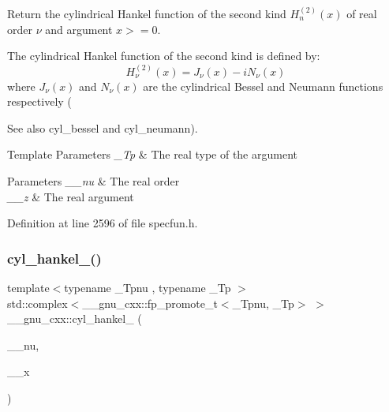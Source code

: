 Return the cylindrical Hankel function of the second kind $ H^{(2)}_n(x) $ of real order $ \nu $ and argument $ x >= 0 $.

The cylindrical Hankel function of the second kind is defined by\+: \[ H^{(2)}_\nu(x) = J_\nu(x) - iN_\nu(x) \] where $ J_\nu(x) $ and $ N_\nu(x) $ are the cylindrical Bessel and Neumann functions respectively (\begin{DoxySeeAlso}{See also}
cyl\+\_\+bessel and cyl\+\_\+neumann).
\end{DoxySeeAlso}

\begin{DoxyTemplParams}{Template Parameters}
{\em \+\_\+\+Tp} & The real type of the argument \\
\hline
\end{DoxyTemplParams}

\begin{DoxyParams}{Parameters}
{\em \+\_\+\+\_\+nu} & The real order \\
\hline
{\em \+\_\+\+\_\+z} & The real argument \\
\hline
\end{DoxyParams}


Definition at line 2596 of file specfun.\+h.

\mbox{\label{group__gnu__math__spec__func_ga326764c0d2dca072c411573503968e50}} 
\subsubsection{\texorpdfstring{cyl\+\_\+hankel\+\_()}{cyl\_hankel\_2()}\hspace{0.1cm}{\footnotesize\ttfamily [2/2]}}
{\footnotesize\ttfamily template$<$typename \+\_\+\+Tpnu , typename \+\_\+\+Tp $>$ \\
std\+::complex$<$\+\_\+\+\_\+gnu\+\_\+cxx\+::fp\+\_\+promote\+\_\+t$<$\+\_\+\+Tpnu, \+\_\+\+Tp$>$ $>$ \+\_\+\+\_\+gnu\+\_\+cxx\+::cyl\+\_\+hankel\+\_ (\begin{DoxyParamCaption}\item[{std\+::complex$<$ \+\_\+\+Tpnu $>$}]{\+\_\+\+\_\+nu,  }\item[{std\+::complex$<$ \+\_\+\+Tp $>$}]{\+\_\+\+\_\+x }\end{DoxyParamCaption})\hspace{0.3cm}{\ttfamily [inline]}}

